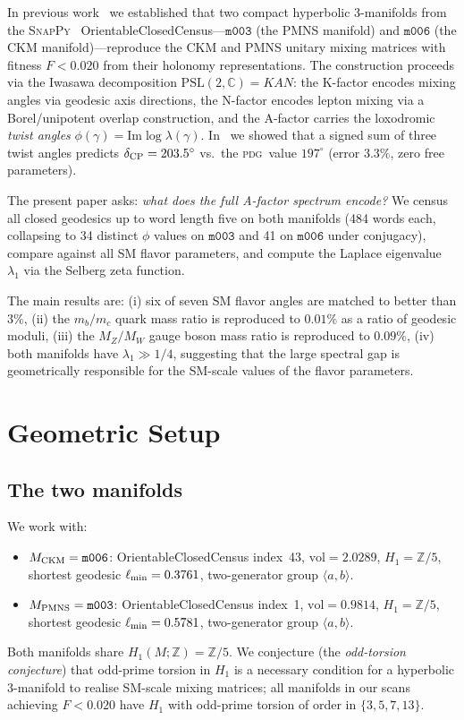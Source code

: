 \documentclass[11pt,a4paper]{article}
\newcommand{\PSL}{\mathrm{PSL}(2,\mathbb{C})}
\newcommand{\mfld}[1]{\texttt{#1}}
\newcommand{\degr}{^{\circ}}
\newcommand{\PDG}{\textsc{pdg}}
\begin{document}
In previous work~\cite{GentryCKM,GentryPMNS,GentryCP} we established that
two compact hyperbolic 3-manifolds from the \textsc{SnapPy}~\cite{SnapPy}
OrientableClosedCensus---$\mfld{m003}$ (the PMNS manifold) and $\mfld{m006}$
(the CKM manifold)---reproduce the CKM and PMNS unitary mixing matrices with
fitness $F < 0.020$ from their holonomy representations.
The construction proceeds via the Iwasawa decomposition
$\PSL = KAN$: the K-factor encodes mixing angles via geodesic axis directions,
the N-factor encodes lepton mixing via a Borel/unipotent overlap construction,
and the A-factor carries the loxodromic \emph{twist angles}
$\phi(\gamma) = \mathrm{Im}\log\lambda(\gamma)$.
In~\cite{GentryCP} we showed that a signed sum of three twist angles predicts
$\delta_{\rm CP} = 203.5\degr$ vs.\ the \PDG\ value $197\degr$ (error $3.3\%$,
zero free parameters).

The present paper asks: \emph{what does the full A-factor spectrum encode?}
We census all closed geodesics up to word length five on both manifolds
(484 words each, collapsing to 34 distinct $\phi$ values on $\mfld{m003}$
and 41 on $\mfld{m006}$ under conjugacy), compare against all SM flavor
parameters, and compute the Laplace eigenvalue $\lambda_1$ via the Selberg
zeta function.

The main results are:
(i) six of seven SM flavor angles are matched to better than $3\%$,
(ii) the $m_b/m_c$ quark mass ratio is reproduced to $0.01\%$ as a ratio of
geodesic moduli,
(iii) the $M_Z/M_W$ gauge boson mass ratio is reproduced to $0.09\%$,
(iv) both manifolds have $\lambda_1 \gg 1/4$, suggesting that the large spectral
gap is geometrically responsible for the SM-scale values of the flavor parameters.

\section{Geometric Setup}
\label{sec:setup}

\subsection{The two manifolds}

We work with:
\begin{itemize}
\item $M_{\rm CKM} = \mfld{m006}$: OrientableClosedCensus index~43,
      $\mathrm{vol}=2.0289$, $H_1=\mathbb{Z}/5$,
      shortest geodesic $\ell_{\rm min}=0.3761$,
      two-generator group $\langle a,b\rangle$.
\item $M_{\rm PMNS} = \mfld{m003}$: OrientableClosedCensus index~1,
      $\mathrm{vol}=0.9814$, $H_1=\mathbb{Z}/5$,
      shortest geodesic $\ell_{\rm min}=0.5781$,
      two-generator group $\langle a,b\rangle$.
\end{itemize}
Both manifolds share $H_1(M;\mathbb{Z})=\mathbb{Z}/5$.
We conjecture (the \emph{odd-torsion conjecture}) that odd-prime torsion
in $H_1$ is a necessary condition for a hyperbolic 3-manifold to realise
SM-scale mixing matrices; all manifolds in our scans achieving $F<0.020$
have $H_1$ with odd-prime torsion of order in $\{3,5,7,13\}$.
\end{document}
